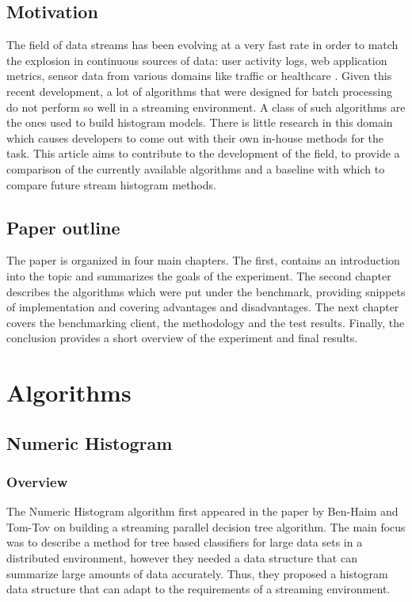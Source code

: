 \documentclass[12pt]{article}
\begin{document}
	\subsection{Motivation}
	The field of data streams has been evolving at a very fast rate in order 
	to match the explosion in continuous sources of data: user activity logs,
	web application metrics, sensor data from various domains like traffic or 
	healthcare \cite{DataStreams}. Given this recent development, a lot of 
	algorithms that were designed for batch processing do not perform so well 
	in a streaming environment. A class of such algorithms are the ones used 
	to build histogram models. There is little research in this domain which 
	causes developers to come out with their own in-house methods for the task.
	This article aims to contribute to the development of the field, to 
	provide a comparison of the currently available algorithms and a baseline 
	with which to compare future stream histogram methods.  

	\subsection{Paper outline}
	The paper is organized in four main chapters. The first, contains an introduction 
	into the topic and summarizes the goals of the experiment. The second chapter 
	describes the algorithms which were put under the benchmark, providing snippets 
	of implementation and covering advantages and disadvantages. The next chapter 
	covers the benchmarking client, the methodology and the test results. Finally,
	the conclusion provides a short overview of the experiment and final results.

	\section{Algorithms}
	\subsection{Numeric Histogram}
	\subsubsection{Overview}
	The Numeric Histogram algorithm first appeared in the paper by Ben-Haim and Tom-Tov
	on building a streaming parallel decision tree algorithm\cite{Ben-Haim:2010:SPD:1756006.1756034}.
	The main focus was to describe a method for tree based classifiers for large data 
	sets in a distributed environment, however they needed a data structure that 
	can summarize large amounts of data accurately. Thus, they proposed a histogram 
	data structure that can adapt to the requirements of a streaming environment. 
\end{document}
